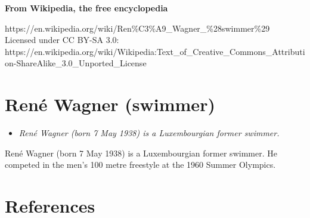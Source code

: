 \textbf{From Wikipedia, the free encyclopedia}

https://en.wikipedia.org/wiki/Ren\%C3\%A9\_Wagner\_\%28swimmer\%29\\
Licensed under CC BY-SA 3.0:\\
https://en.wikipedia.org/wiki/Wikipedia:Text\_of\_Creative\_Commons\_Attribution-ShareAlike\_3.0\_Unported\_License

\section{René Wagner (swimmer)}\label{renuxe9-wagner-swimmer}

\begin{itemize}
\item
  \emph{René Wagner (born 7 May 1938) is a Luxembourgian former
  swimmer.}
\end{itemize}

René Wagner (born 7 May 1938) is a Luxembourgian former swimmer. He
competed in the men's 100 metre freestyle at the 1960 Summer Olympics.

\section{References}\label{references}
